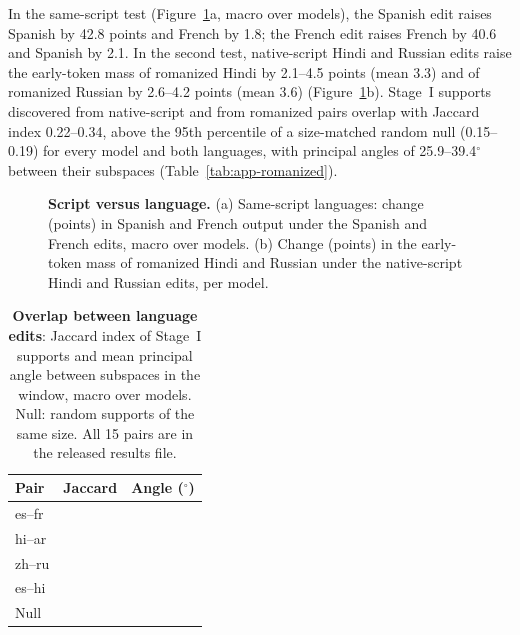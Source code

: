 In the same-script test (Figure~\ref{fig:app-script}a, macro over models), the Spanish edit raises Spanish by 42.8 points and French by 1.8; the French edit raises French by 40.6 and Spanish by 2.1. In the second test, native-script Hindi and Russian edits raise the early-token mass of romanized Hindi by 2.1--4.5 points (mean 3.3) and of romanized Russian by 2.6--4.2 points (mean 3.6) (Figure~\ref{fig:app-script}b). Stage~I supports discovered from native-script and from romanized pairs overlap with Jaccard index 0.22--0.34, above the 95th percentile of a size-matched random null (0.15--0.19) for every model and both languages, with principal angles of 25.9--39.4$^\circ$ between their subspaces (Table~\ref{tab:app-romanized}).

\begin{figure}[!htbp]
  \centering
  \caption{\textbf{Script versus language.} (a) Same-script languages: change (points) in Spanish and French output under the Spanish and French edits, macro over models. (b) Change (points) in the early-token mass of romanized Hindi and Russian under the native-script Hindi and Russian edits, per model.}
  \label{fig:app-script}
\end{figure}

\begin{table}[!htbp]
  \centering
  \footnotesize
  \setlength{\tabcolsep}{3pt}
  \begin{tabular}{@{}lcc@{}}
    \toprule
    \textbf{Pair} & \textbf{Jaccard} & \textbf{Angle ($^\circ$)} \\
    \midrule
    es--fr & & \\
    hi--ar & & \\
    zh--ru & & \\
    es--hi & & \\
    Null & & \\
    \bottomrule
  \end{tabular}
  \caption{\textbf{Overlap between language edits}: Jaccard index of Stage~I supports and mean principal angle between subspaces in the window, macro over models. Null: random supports of the same size. All 15 pairs are in the released results file.}
  \label{tab:app-overlap}
\end{table}

